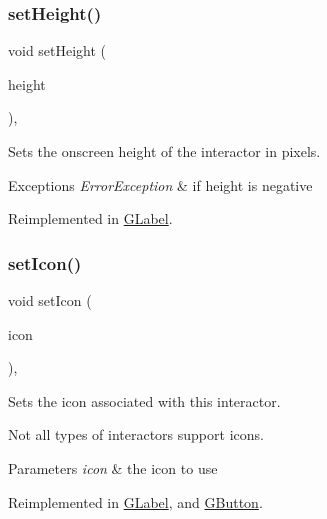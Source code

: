 \subsubsection{\texorpdfstring{set\+Height()}{setHeight()}}
{\footnotesize\ttfamily void set\+Height (\begin{DoxyParamCaption}\item[{double}]{height }\end{DoxyParamCaption})\hspace{0.3cm}{\ttfamily [virtual]}, {\ttfamily [inherited]}}



Sets the onscreen height of the interactor in pixels. 


\begin{DoxyExceptions}{Exceptions}
{\em Error\+Exception} & if height is negative \\
\hline
\end{DoxyExceptions}


Reimplemented in \mbox{\hyperlink{classGLabel_a5eead864d1249c4406f32f9944ed1503}{G\+Label}}.

\mbox{\label{classGInteractor_a542abfcd7261751352af129c7215ecda}} 
\subsubsection{\texorpdfstring{set\+Icon()}{setIcon()}\hspace{0.1cm}{\footnotesize\ttfamily [1/3]}}
{\footnotesize\ttfamily void set\+Icon (\begin{DoxyParamCaption}\item[{const Q\+Icon \&}]{icon }\end{DoxyParamCaption})\hspace{0.3cm}{\ttfamily [virtual]}, {\ttfamily [inherited]}}



Sets the icon associated with this interactor. 

Not all types of interactors support icons. 
\begin{DoxyParams}{Parameters}
{\em icon} & the icon to use \\
\hline
\end{DoxyParams}


Reimplemented in \mbox{\hyperlink{classGLabel_acca97b6c6330abded1c80521c9aca3a6}{G\+Label}}, and \mbox{\hyperlink{classGButton_acca97b6c6330abded1c80521c9aca3a6}{G\+Button}}.

